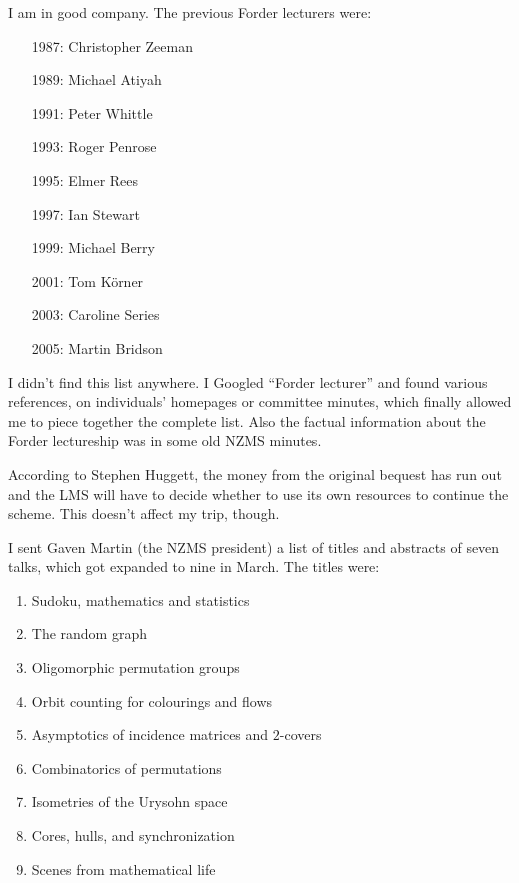 \documentclass[12pt,a4paper]{article}
\begin{document}
\par\indent
I am in good company. The previous Forder lecturers were:
\begin{itemize}\itemsep0pt
\item[1987:] Christopher Zeeman
\item[1989:] Michael Atiyah
\item[1991:] Peter Whittle
\item[1993:] Roger Penrose
\item[1995:] Elmer Rees
\item[1997:] Ian Stewart
\item[1999:] Michael Berry
\item[2001:] Tom K\"orner
\item[2003:] Caroline Series
\item[2005:] Martin Bridson
\end{itemize}

I didn't find this list anywhere. I Googled ``Forder lecturer'' and found
various references, on individuals' homepages or committee minutes, which
finally allowed me to piece together the complete list. Also the factual
information about the Forder lectureship was in some old NZMS minutes.

According to Stephen Huggett, the money from the original bequest has
run out and the LMS will have to decide whether to use its own resources
to continue the scheme. This doesn't affect my trip, though.

I sent Gaven Martin (the NZMS president) a list of titles and abstracts
of seven talks, which got expanded to nine in March. The titles were:
\begin{enumerate}\itemsep0pt
\item Sudoku, mathematics and statistics
\item The random graph
\item Oligomorphic permutation groups
\item Orbit counting for colourings and flows
\item Asymptotics of incidence matrices and $2$-covers
\item Combinatorics of permutations
\item Isometries of the Urysohn space
\item Cores, hulls, and synchronization
\item Scenes from mathematical life
\end{enumerate}
\end{document}
